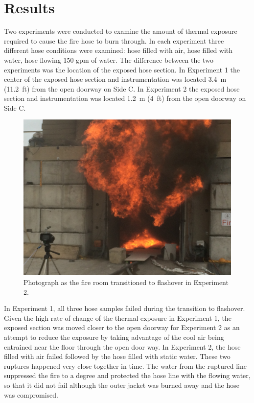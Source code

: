 \documentclass[letterpaper,11pt]{texMemo} %
\begin{document}
\section{Results}
Two experiments were conducted to examine the amount of thermal exposure required to cause the fire hose to burn through. In each experiment three different hose conditions were examined: hose filled with air, hose filled with water, hose flowing 150 gpm of water. The difference between the two experiments was the location of the exposed hose section. In Experiment 1 the center of the exposed hose section and instrumentation was located 3.4~m (11.2~ft) from the open doorway on Side C. In Experiment 2 the exposed hose section and instrumentation was located 1.2~m (4~ft) from the open doorway on Side C.  

\begin{figure}[!ht]
\centering
\includegraphics[width=.8\columnwidth]{../Figures/Hose_Figures/IMG_8431}
\caption{Photograph as the fire room transitioned to flashover in Experiment 2.}
\label{fig:flashover}
\end{figure}

In Experiment 1, all three hose samples failed during the transition to flashover. Given the high rate of change of the thermal exposure in Experiment 1, the exposed section was moved closer to the open doorway for Experiment 2 as an attempt to reduce the exposure by taking advantage of the cool air being entrained near the floor through the open door way. In Experiment 2, the hose filled with air failed followed by the hose filled with static water.  These two ruptures happened very close together in time. The water from the ruptured line suppressed the fire to a degree and protected the hose line with the flowing water, so that it did not fail although the outer jacket was burned away and the hose was compromised.
\end{document}
